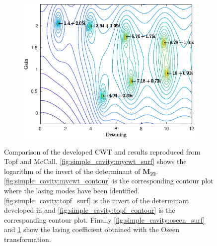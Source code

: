 \begin{figure}
\begin{subfigure}{0.32\textwidth}
		\includegraphics[width=\textwidth]{plots/simple/contour_oseen}
		\caption{}
		\label{fig:simple_cavity:oseen_contour}
	\end{subfigure}
	\caption[Comparison between methods for modeling a simple cavity.]{Comparison of the developed CWT and results reproduced from Topf and McCall\cite{topf_modes_2014}. \ref{fig:simple_cavity:mycwt_surf} shows the logarithm of the invert of the determinant of $\bm{M_{22}}$. \ref{fig:simple_cavity:mycwt_contour} is the corresponding contour plot where the lasing modes have been identified. \ref{fig:simple_cavity:topf_surf} is the invert of the determinant developed in \cite{topf_modes_2014} and \ref{fig:simple_cavity:topf_contour} is the corresponding contour plot. Finally \ref{fig:simple_cavity:oseen_surf} and \ref{fig:simple_cavity:oseen_contour} show the lasing coefficient obtained with the Oseen transformation.}
	\label{fig:simple_cavity:surf}
\end{figure}

